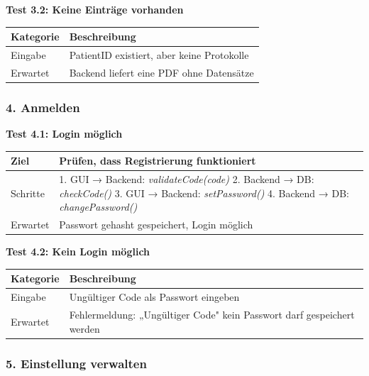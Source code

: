 \vspace{0.5cm}

\textbf{Test 3.2: Keine Einträge vorhanden} \\
\begin{tabular}{|p{4cm}|p{10cm}|}
    \hline
    Kategorie & Beschreibung \\
    \hline
    Eingabe & PatientID existiert, aber keine Protokolle \\
    \hline
    Erwartet & Backend liefert eine PDF ohne Datensätze \\
    \hline
\end{tabular}

\vspace{1cm}

\subsubsection*{4. Anmelden}

\textbf{Test 4.1: Login möglich} \\
\begin{tabular}{|p{4cm}|p{10cm}|}
    \hline
    Ziel & Prüfen, dass Registrierung funktioniert \\
    \hline
    Schritte & 
    1. GUI → Backend: \textit{validateCode(code)} 
    2. Backend → DB: \textit{checkCode()} 
    3. GUI → Backend: \textit{setPassword()} 
    4. Backend → DB: \textit{changePassword()} \\
    \hline
    Erwartet & Passwort gehasht gespeichert, Login möglich \\
    \hline
\end{tabular}

\vspace{0.5cm}

\textbf{Test 4.2: Kein Login möglich} \\
\begin{tabular}{|p{4cm}|p{10cm}|}
    \hline
    Kategorie & Beschreibung \\
    \hline
    Eingabe & Ungültiger Code als Passwort eingeben \\
    \hline
    Erwartet & Fehlermeldung: „Ungültiger Code" kein Passwort darf gespeichert werden \\
    \hline
\end{tabular}

\vspace{1cm}

\subsubsection*{5. Einstellung verwalten}

